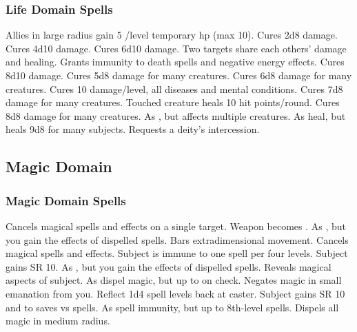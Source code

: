 \subsubsection{Life Domain Spells}
\begin{spelllist}
 Allies in large radius gain 5 /level temporary hp (max 10).
 Cures 2d8 damage.
\spellhead[2]{}
 Cures 4d10 damage.
 Cures 6d10 damage.
 Two targets share each others' damage and healing.
 Grants immunity to death spells and negative energy effects.
 Cures 8d10 damage.
 Cures 5d8 damage for many creatures.
\spellhead[5]{}
 Cures 6d8 damage for many creatures.
 Cures 10 damage/level, all diseases and mental conditions.  
 Cures 7d8 damage for many creatures.
 Touched creature heals 10 hit points/round.
 Cures 8d8 damage for many creatures.
 As , but affects multiple creatures.
 As heal, but heals 9d8 for many subjects.
 Requests a deity's intercession.
\end{spelllist}

\subsection{Magic Domain}

\subsubsection{Magic Domain Spells}
\begin{spelllist}
 Cancels magical spells and effects on a single target.
 Weapon becomes .
 As , but you gain the effects of dispelled spells.
 Bars extradimensional movement.
 Cancels magical spells and effects.
 Subject is immune to one spell per four levels.
 Subject gains SR 10.
 As , but you gain the effects of dispelled spells.
\F Reveals magical aspects of subject.
 As dispel magic, but up to  on check.
 Negates magic in small emanation from you.
 Reflect 1d4 spell levels back at caster.
 Subject gains SR 10 and  to saves vs spells.
 As spell immunity, but up to 8th-level spells.
 Dispels all magic in medium radius.
\spellhead[9]{}
\end{spelllist}
